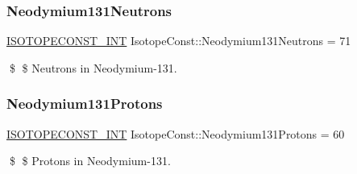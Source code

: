 \subsubsection{\texorpdfstring{Neodymium131\+Neutrons}{Neodymium131Neutrons}}
{\footnotesize\ttfamily \mbox{\hyperlink{group___isotope_const-_macros_ga5f18360b3e99483a35c32d789e62621c}{I\+S\+O\+T\+O\+P\+E\+C\+O\+N\+S\+T\+\_\+\+I\+NT}} Isotope\+Const\+::\+Neodymium131\+Neutrons = 71}

\$ \$ Neutrons in Neodymium-\/131. \mbox{\label{group___isotope_const-_neodymium-_nd131_ga1cd483fe2c53ac8040c6fde64a414961}} 
\subsubsection{\texorpdfstring{Neodymium131\+Protons}{Neodymium131Protons}}
{\footnotesize\ttfamily \mbox{\hyperlink{group___isotope_const-_macros_ga5f18360b3e99483a35c32d789e62621c}{I\+S\+O\+T\+O\+P\+E\+C\+O\+N\+S\+T\+\_\+\+I\+NT}} Isotope\+Const\+::\+Neodymium131\+Protons = 60}

\$ \$ Protons in Neodymium-\/131. 